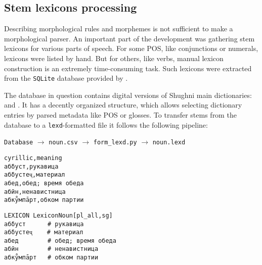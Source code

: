 \subsection{Stem lexicons processing} \label{stem_lexicons}
Describing morphological rules and morphemes is not sufficient to make a morphological parser. An important part of the development was gathering stem lexicons for various parts of speech. For some POS, like conjunctions or numerals, lexicons were listed by hand. But for others, like verbs, manual lexicon construction is an extremely time-consuming task. Such lexicons were extracted from the \texttt{SQLite} database provided by \textcite{makarov_digital_2022}. 

The database in question contains digital versions of Shughni main dictionaries: \textcite{karamshoev_dict_1988} and \textcite{zarubin_dict_1960}. It has a decently organized structure, which allows selecting dictionary entries by parsed metadata like POS or glosses. To transfer stems from the database to a \texttt{lexd}-formatted file it follows the following pipeline:

\begin{center}
    \texttt{Database} $\rightarrow$ \texttt{noun.csv} $\rightarrow$ \texttt{form\_lexd.py} $\rightarrow$ \texttt{noun.lexd}
\end{center}

\begin{code_frame}[float]
    \begin{subbox}[title={Exported \texttt{noun.csv} fragment},height=3.3cm]
        \begin{footnotesize}\codespacing
        \begin{verbatim}
cyrillic,meaning
абδуст,рукавица
абδустеҷ,материал
абед,обед; время обеда
абӣн,ненавистница
абку̊мпāрт,обком партии
        \end{verbatim}
        \end{footnotesize}
    \end{subbox}
    \begin{subbox}[title={Generated \texttt{noun.lexd} fragment},height=3.3cm]
        \begin{footnotesize}\codespacing
        \begin{verbatim}
LEXICON LexiconNoun[pl_all,sg]
абδуст      # рукавица
абδустеҷ    # материал
абед        # обед; время обеда
абӣн        # ненавистница
абку̊мпāрт   # обком партии
        \end{verbatim}
        \end{footnotesize}
    \end{subbox}
    \tcblower
    \label{code:6_1}
\end{code_frame}

